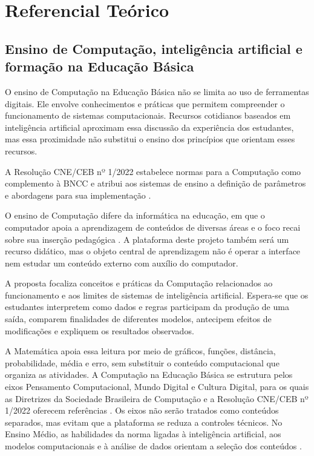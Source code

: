 \chapter{Referencial Teórico}

\section{Ensino de Computação, inteligência artificial e formação na Educação Básica}

O ensino de Computação na Educação Básica não se limita ao uso de ferramentas digitais. Ele envolve conhecimentos e práticas que permitem compreender o funcionamento de sistemas computacionais. Recursos cotidianos baseados em inteligência artificial aproximam essa discussão da experiência dos estudantes, mas essa proximidade não substitui o ensino dos princípios que orientam esses recursos.

A Resolução CNE/CEB nº 1/2022 estabelece normas para a Computação como complemento à BNCC e atribui aos sistemas de ensino a definição de parâmetros e abordagens para sua implementação \cite{brasil2022computacao}.

O ensino de Computação difere da informática na educação, em que o computador apoia a aprendizagem de conteúdos de diversas áreas e o foco recai sobre sua inserção pedagógica \cite{valente2002uso}. A plataforma deste projeto também será um recurso didático, mas o objeto central de aprendizagem não é operar a interface nem estudar um conteúdo externo com auxílio do computador.

A proposta focaliza conceitos e práticas da Computação relacionados ao funcionamento e aos limites de sistemas de inteligência artificial. Espera-se que os estudantes interpretem como dados e regras participam da produção de uma saída, comparem finalidades de diferentes modelos, antecipem efeitos de modificações e expliquem os resultados observados.

A Matemática apoia essa leitura por meio de gráficos, funções, distância, probabilidade, média e erro, sem substituir o conteúdo computacional que organiza as atividades. A Computação na Educação Básica se estrutura pelos eixos Pensamento Computacional, Mundo Digital e Cultura Digital, para os quais as Diretrizes da Sociedade Brasileira de Computação e a Resolução CNE/CEB nº 1/2022 oferecem referências \cite{sbc2018diretrizes,brasil2022computacao}. Os eixos não serão tratados como conteúdos separados, mas evitam que a plataforma se reduza a controles técnicos. No Ensino Médio, as habilidades da norma ligadas à inteligência artificial, aos modelos computacionais e à análise de dados orientam a seleção dos conteúdos \cite{brasil2022computacao}.

